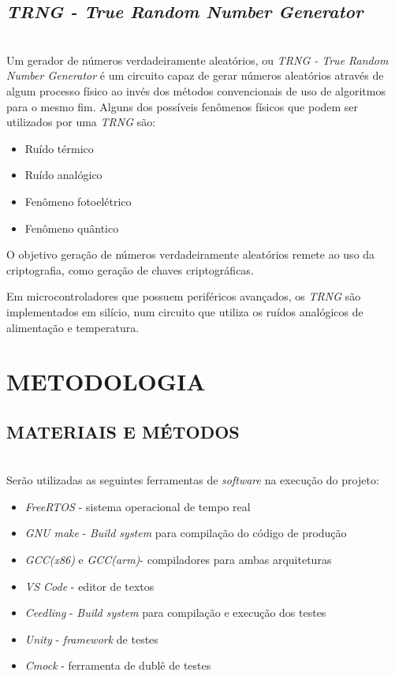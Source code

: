\documentclass[times, twoside, watermark]{artigo}
\begin{document}
\subsection{\textit{TRNG - True Random Number Generator}}\hfill\\

Um gerador de números verdadeiramente aleatórios, ou \textit{TRNG - True Random 
Number Generator} é um circuito capaz de gerar números aleatórios através
de algum processo físico ao invés dos métodos convencionais de uso de algoritmos
para o mesmo fim.
Alguns dos possíveis fenômenos físicos que podem ser utilizados por uma \textit{TRNG}
são:

\begin{itemize}
  \item Ruído térmico
  \item Ruído analógico
  \item Fenômeno fotoelétrico
  \item Fenômeno quântico
\end{itemize}

O objetivo geração de números verdadeiramente aleatórios remete ao uso da 
criptografia, como geração de chaves criptográficas.

Em microcontroladores que possuem periféricos avançados, os \textit{TRNG} são 
implementados em silício, num circuito que utiliza os ruídos analógicos de 
alimentação e temperatura.\cite{vasyltsov2008fast}

\section{METODOLOGIA}

\subsection{MATERIAIS E MÉTODOS}\hfill\\

Serão utilizadas as seguintes ferramentas de \textit{software} na execução do projeto:

\begin{itemize}
  \item \textit{FreeRTOS} - sistema operacional de tempo real
  \item \textit{GNU make} - \textit{Build system} para compilação do código de produção
  \item \textit{GCC(x86)} e \textit{GCC(arm)}- compiladores para ambas arquiteturas
  \item \textit{VS Code} - editor de textos
  \item \textit{Ceedling} - \textit{Build system} para compilação e execução dos testes
  \item \textit{Unity} - \textit{framework} de testes
  \item \textit{Cmock} - ferramenta de dublê de testes
\end{itemize}
\end{document}
